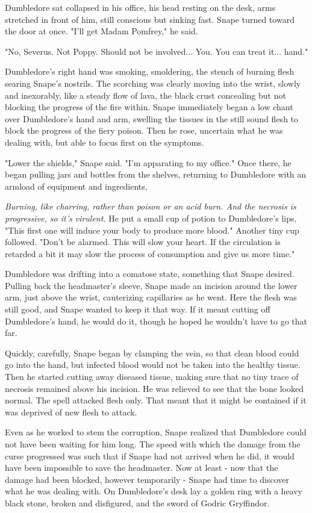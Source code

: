 \documentclass[a4paper,11pt]{article}
\begin{document}
Dumbledore sat collapsed in his office, his head resting on the desk, arms stretched in front of him, still conscious but sinking fast. Snape turned toward the door at once. "I'll get Madam Pomfrey," he said.

"No, Severus. Not Poppy. Should not be involved... You. You can treat it... hand."

Dumbledore's right hand was smoking, smoldering, the stench of burning flesh searing Snape's nostrils. The scorching was clearly moving into the wrist, slowly and inexorably, like a steady flow of lava, the black crust concealing but not blocking the progress of the fire within. Snape immediately began a low chant over Dumbledore's hand and arm, swelling the tissues in the still sound flesh to block the progress of the fiery poison. Then he rose, uncertain what he was dealing with, but able to focus first on the symptoms.

"Lower the shields," Snape said. "I'm apparating to my office." Once there, he began pulling jars and bottles from the shelves, returning to Dumbledore with an armload of equipment and ingredients,

\emph{Burning, like charring, rather than poison or an acid burn. And the necrosis is progressive, so it's virulent.} He put a small cup of potion to Dumbledore's lips, "This first one will induce your body to produce more blood." Another tiny cup followed. "Don't be alarmed. This will slow your heart. If the circulation is retarded a bit it may slow the process of consumption and give us more time."

Dumbledore was drifting into a comatose state, something that Snape desired. Pulling back the headmaster's sleeve, Snape made an incision around the lower arm, just above the wrist, cauterizing capillaries as he went. Here the flesh was still good, and Snape wanted to keep it that way. If it meant cutting off Dumbledore's hand, he would do it, though he hoped he wouldn't have to go that far.

Quickly, carefully, Snape began by clamping the vein, so that clean blood could go into the hand, but infected blood would not be taken into the healthy tissue. Then he started cutting away diseased tissue, making sure that no tiny trace of necrosis remained above his incision. He was relieved to see that the bone looked normal. The spell attacked flesh only. That meant that it might be contained if it was deprived of new flesh to attack.

Even as he worked to stem the corruption, Snape realized that Dumbledore could not have been waiting for him long. The speed with which the damage from the curse progressed was such that if Snape had not arrived when he did, it would have been impossible to save the headmaster. Now at least - now that the damage had been blocked, however temporarily - Snape had time to discover what he was dealing with. On Dumbledore's desk lay a golden ring with a heavy black stone, broken and disfigured, and the sword of Godric Gryffindor.
\end{document}
